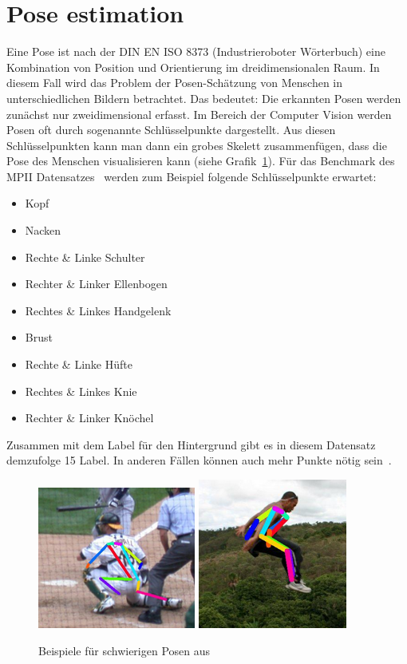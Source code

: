 \documentclass[journal, a4paper]{IEEEtran}
\begin{document}
\section{Pose estimation} \label{sec:pose_estimation}
	Eine Pose ist nach der DIN EN ISO 8373 (Industrieroboter Wörterbuch) eine Kombination von Position und Orientierung im dreidimensionalen Raum. In diesem Fall wird das Problem der Posen-Schätzung von Menschen in unterschiedlichen Bildern betrachtet. Das bedeutet: Die erkannten Posen werden zunächst nur zweidimensional erfasst. Im Bereich der Computer Vision werden Posen oft durch sogenannte Schlüsselpunkte dargestellt. Aus diesen Schlüsselpunkten kann man dann ein grobes Skelett zusammenfügen, dass die Pose des Menschen visualisieren kann (siehe Grafik~\ref{fig:hard_pose}).
        Für das Benchmark des MPII Datensatzes~\cite{MPII} 
        werden zum Beispiel folgende Schlüsselpunkte erwartet:
        \begin{itemize}
        \item Kopf 
        \item Nacken
        \item Rechte \& Linke Schulter
        \item Rechter \& Linker Ellenbogen
        \item Rechtes \& Linkes Handgelenk
        \item Brust
        \item Rechte \& Linke Hüfte
        \item Rechtes \& Linkes Knie
        \item Rechter \& Linker Knöchel
        \end{itemize}
        Zusammen mit dem Label für den Hintergrund gibt es in diesem Datensatz demzufolge 15 Label. In anderen Fällen können auch mehr Punkte nötig sein~\cite{lin2014microsoft}.
        \begin{figure}[!hbt]
                \includegraphics[width=0.4\columnwidth]{hardpose_1.png}
                \includegraphics[width=0.35\columnwidth]{hardpose_2.png}
                \caption{Beispiele für schwierigen Posen aus~\cite{toshev2014deeppose}}
                \label{fig:hard_pose}
        \end{figure}
\end{document}
